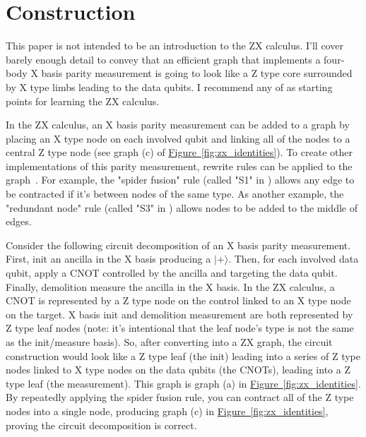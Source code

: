 \documentclass[onecolumn,unpublished,a4paper]{quantumarticle}
\theoremstyle{definition}
\theoremstyle{definition}
\theoremstyle{definition}
\newcommand{\fig}[1]{\hyperref[fig:#1]{Figure~\ref*{fig:#1}}}
\begin{document}
\section{Construction}
\label{sec:construction}

This paper is not intended to be an introduction to the ZX calculus.
I'll cover barely enough detail to convey that an efficient graph that implements a four-body X basis parity measurement is going to look like a Z type core surrounded by X type limbs leading to the data qubits.
I recommend any of \cite{backens2016simplifiedzx,de2017zx,coecke2017picturing} as starting points for learning the ZX calculus.

In the ZX calculus, an X basis parity measurement can be added to a graph by placing an X type node on each involved qubit and linking all of the nodes to a central Z type node (see graph (c) of \fig{zx_identities}).
To create other implementations of this parity measurement, rewrite rules can be applied to the graph~\cite{backens2016simplifiedzx}.
For example, the "spider fusion" rule (called "S1" in \cite{backens2016simplifiedzx}) allows any edge to be contracted if it's between nodes of the same type.
As another example, the "redundant node" rule (called "S3" in \cite{backens2016simplifiedzx}) allows nodes to be added to the middle of edges.

Consider the following circuit decomposition of an X basis parity measurement.
First, init an ancilla in the X basis producing a $|+\rangle$.
Then, for each involved data qubit, apply a CNOT controlled by the ancilla and targeting the data qubit.
Finally, demolition measure the ancilla in the X basis.
In the ZX calculus, a CNOT is represented by a Z type node on the control linked to an X type node on the target.
X basis init and demolition measurement are both represented by Z type leaf nodes (note: it's intentional that the leaf node's type is not the same as the init/measure basis).
So, after converting into a ZX graph, the circuit construction would look like a Z type leaf (the init) leading into a series of Z type nodes linked to X type nodes on the data qubits (the CNOTs), leading into a Z type leaf (the measurement).
This graph is graph (a) in \fig{zx_identities}.
By repeatedly applying the spider fusion rule, you can contract all of the Z type nodes into a single node, producing graph (c) in \fig{zx_identities}, proving the circuit decomposition is correct.
\end{document}
